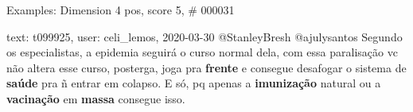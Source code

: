 \begin{frame}{Examples: Dimension 4 pos, score 5, \# 000031}
\footnotesize
\begin{exampleblock}{text: t099925, user: celi\_lemos, 2020-03-30}
@StanleyBresh @ajulysantos Segundo os especialistas, a epidemia seguirá o curso 
normal dela, com essa paralisação vc não altera esse curso, posterga, joga pra 
\textbf{frente} e consegue desafogar o sistema de \textbf{saúde} pra ñ entrar 
em colapso. E só, pq apenas a \textbf{imunização} natural ou a 
\textbf{vacinação} em \textbf{massa} consegue isso. 
\end{exampleblock}
\end{frame}
